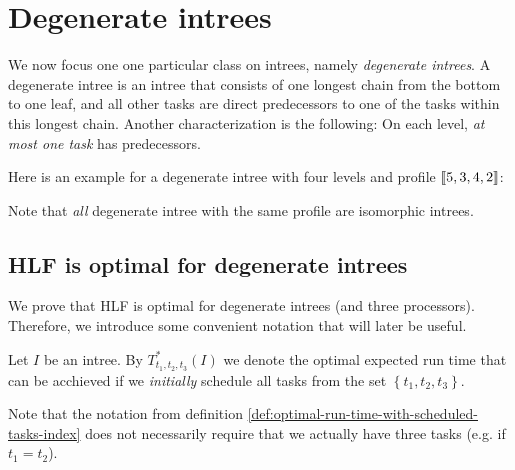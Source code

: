 \section{Degenerate intrees}
\label{sec:p3-degenerate-intrees}

We now focus one one particular class on intrees, namely \emph{degenerate intrees}. A degenerate intree is an intree that consists of one longest chain from the bottom to one leaf, and all other tasks are direct predecessors to one of the tasks within this longest chain. Another characterization is the following: On each level, \emph{at most one task} has predecessors. 

Here is an example for a degenerate intree with four levels and profile $\left\llbracket 5,3,4,2 \right\rrbracket$:

\begin{center}  
\end{center}

Note that \emph{all} degenerate intree with the same profile are isomorphic intrees.

\subsection{HLF is optimal for degenerate intrees}
\label{sec:p3-degenerate-intrees-hlf-optimal}

We prove that HLF is optimal for degenerate intrees (and three processors). Therefore, we introduce some convenient notation that will later be useful.

\begin{definition}
  \label{def:optimal-run-time-with-scheduled-tasks-index}
  Let $I$ be an intree.
  By $T^*_{t_1,t_2,t_3}(I)$ we denote the optimal expected run time that can be acchieved if we \emph{initially} schedule all tasks from the set $\left\{ t_1,t_2,t_3 \right\}$.
\end{definition}

Note that the notation from definition   \ref{def:optimal-run-time-with-scheduled-tasks-index} does not necessarily require that we actually have three tasks (e.g. if $t_1=t_2$).

